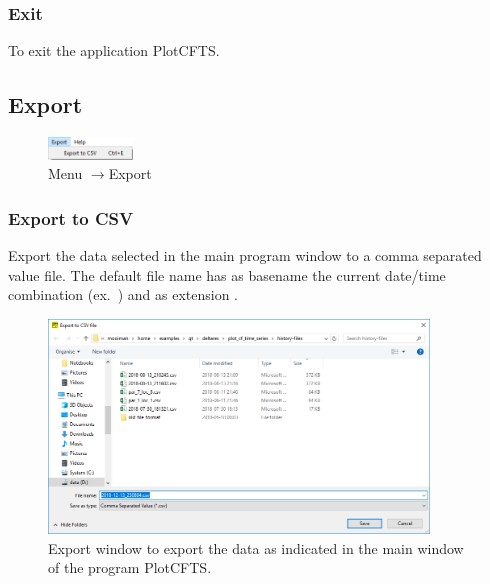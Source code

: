 \documentclass{deltares_memo}
\newcommand{\menuarrow}{$\rightarrow$}
\newcommand{\plotcfts}{PlotCFTS\xspace}
\begin{document}
\subsubsection{Exit}
To exit the application \plotcfts.

\subsection{Export}
\phantom{m}\vspace{-\baselineskip}
\begin{figure}[H]
    \centering    
    \includegraphics[width=0.20\textwidth]{pictures/menu_export.png}
    \caption{Menu \menuarrow Export}
\end{figure}

\subsubsection{Export to CSV}
Export the data selected in the main program window to a comma separated value file. 
The default file name has as basename the current date/time combination  (ex.\ ) and as extension .
\begin{figure}[H]
    \centering    
    \includegraphics[width=0.9\textwidth]{pictures/menu_export_csv.png}
    \caption{Export window to export the data as indicated in the main window of the program \plotcfts.}
\end{figure}

\end{document}
